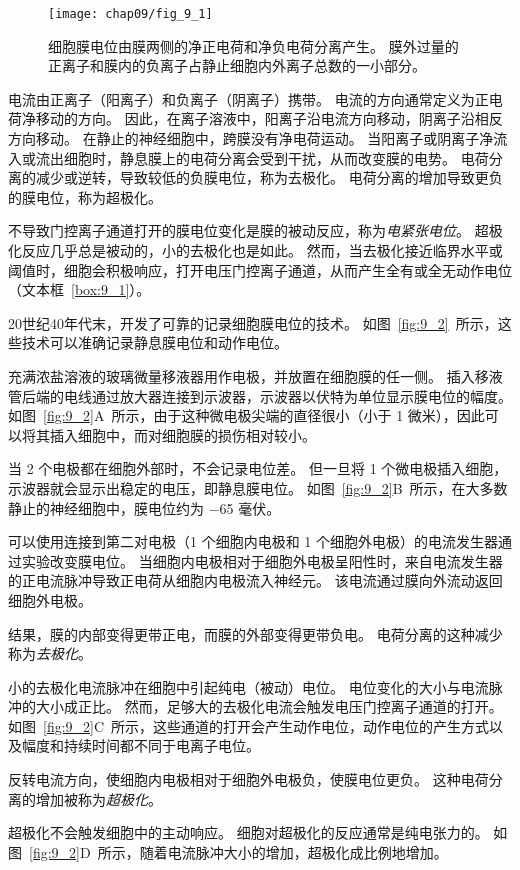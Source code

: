 \begin{figure}[htbp]
	\centering
	\texttt{[image: chap09/fig\_9\_1]}
	\caption{细胞膜电位由膜两侧的净正电荷和净负电荷分离产生。
		膜外过量的正离子和膜内的负离子占静止细胞内外离子总数的一小部分。}
	\label{fig:9_1}
\end{figure}


电流由正离子（阳离子）和负离子（阴离子）携带。
电流的方向通常定义为正电荷净移动的方向。
因此，在离子溶液中，阳离子沿电流方向移动，阴离子沿相反方向移动。
在静止的神经细胞中，跨膜没有净电荷运动。
当阳离子或阴离子净流入或流出细胞时，静息膜上的电荷分离会受到干扰，从而改变膜的电势。
电荷分离的减少或逆转，导致较低的负膜电位，称为去极化。
电荷分离的增加导致更负的膜电位，称为超极化。


不导致门控离子通道打开的膜电位变化是膜的被动反应，称为\textit{电紧张电位}。
超极化反应几乎总是被动的，小的去极化也是如此。
然而，当去极化接近临界水平或阈值时，细胞会积极响应，打开电压门控离子通道，从而产生全有或全无动作电位（文本框~\ref{box:9_1}）。


\begin{proposition}[记录膜电位] \label{box:9_1}
	
	\quad \quad 20世纪40年代末，开发了可靠的记录细胞膜电位的技术。
	如图~\ref{fig:9_2}~所示，这些技术可以准确记录静息膜电位和动作电位。
	
	\quad \quad 充满浓盐溶液的玻璃微量移液器用作电极，并放置在细胞膜的任一侧。
	插入移液管后端的电线通过放大器连接到示波器，示波器以伏特为单位显示膜电位的幅度。
	如图~\ref{fig:9_2}A~所示，由于这种微电极尖端的直径很小（小于 1 微米），因此可以将其插入细胞中，而对细胞膜的损伤相对较小。
	
	\quad \quad 当 2 个电极都在细胞外部时，不会记录电位差。
	但一旦将 1 个微电极插入细胞，示波器就会显示出稳定的电压，即静息膜电位。
	如图~\ref{fig:9_2}B~所示，在大多数静止的神经细胞中，膜电位约为 −65 毫伏。
	
	\quad \quad 可以使用连接到第二对电极（1 个细胞内电极和 1 个细胞外电极）的电流发生器通过实验改变膜电位。
	当细胞内电极相对于细胞外电极呈阳性时，来自电流发生器的正电流脉冲导致正电荷从细胞内电极流入神经元。
	该电流通过膜向外流动返回细胞外电极。
	
	\quad \quad 结果，膜的内部变得更带正电，而膜的外部变得更带负电。
	电荷分离的这种减少称为\textit{去极化}。
	
	\quad \quad 小的去极化电流脉冲在细胞中引起纯电（被动）电位。
	电位变化的大小与电流脉冲的大小成正比。
	然而，足够大的去极化电流会触发电压门控离子通道的打开。
	如图~\ref{fig:9_2}C~所示，这些通道的打开会产生动作电位，动作电位的产生方式以及幅度和持续时间都不同于电离子电位。
	
	\quad \quad 反转电流方向，使细胞内电极相对于细胞外电极负，使膜电位更负。
	这种电荷分离的增加被称为\textit{超极化}。
	
	\quad \quad 超极化不会触发细胞中的主动响应。
	细胞对超极化的反应通常是纯电张力的。
	如图~\ref{fig:9_2}D~所示，随着电流脉冲大小的增加，超极化成比例地增加。

	
\end{proposition}


